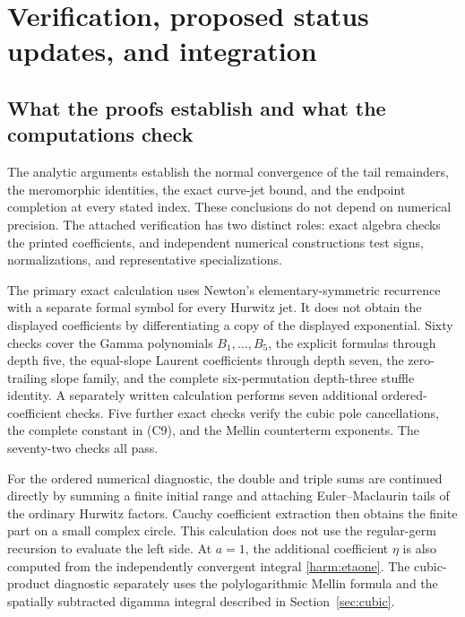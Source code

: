 \section{Verification, proposed status updates, and integration}
\label{sec:verification}

\subsection{What the proofs establish and what the computations check}

The analytic arguments establish the normal convergence of the tail
remainders, the meromorphic identities, the exact curve-jet bound,
and the endpoint completion at every stated index. These conclusions
do not depend on numerical precision. The attached verification has
two distinct roles: exact algebra checks the printed coefficients,
and independent numerical constructions test signs, normalizations,
and representative specializations.

The primary exact calculation uses Newton's elementary-symmetric
recurrence with a separate formal symbol for every Hurwitz jet. It
does not obtain the displayed coefficients by differentiating a copy
of the displayed exponential. Sixty checks cover the Gamma polynomials
$B_1,\ldots,B_5$, the explicit formulas through depth five, the
equal-slope Laurent coefficients through depth seven, the zero-trailing
slope family, and the complete six-permutation depth-three stuffle
identity. A separately written calculation performs seven additional
ordered-coefficient checks. Five further exact checks verify the
cubic pole cancellations, the complete constant in (C9), and the
Mellin counterterm exponents. The seventy-two checks all pass.

For the ordered numerical diagnostic, the double and triple sums are
continued directly by summing a finite initial range and attaching
Euler--Maclaurin tails of the ordinary Hurwitz factors. Cauchy
coefficient extraction then obtains the finite part on a small
complex circle. This calculation does not use the regular-germ
recursion to evaluate the left side. At $a=1$, the additional
coefficient $\eta$ is also computed from the independently convergent
integral \eqref{harm:etaone}. The cubic-product diagnostic separately
uses the polylogarithmic Mellin formula and the spatially subtracted
digamma integral described in Section~\ref{sec:cubic}.

